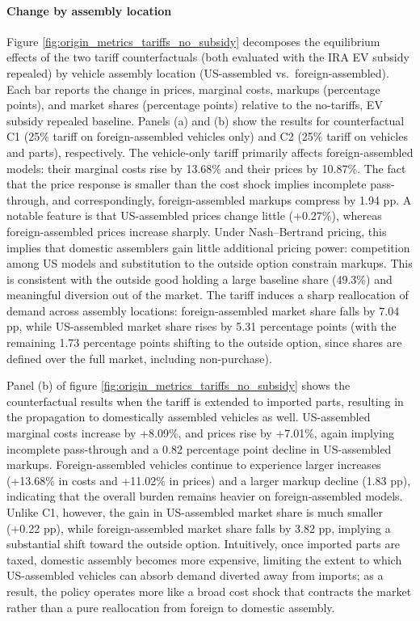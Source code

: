 \documentclass[11pt]{article}
\begin{document}
\paragraph{Change by assembly location}

Figure \ref{fig:origin_metrics_tariffs_no_subsidy} decomposes the equilibrium effects of the two tariff counterfactuals (both evaluated with the IRA EV subsidy repealed) by vehicle assembly location (US-assembled vs.\ foreign-assembled). Each bar reports the change in prices, marginal costs, markups (percentage points), and market shares (percentage points) relative to the no-tariffs, EV subsidy repealed baseline. Panels (a) and (b) show the results for counterfactual C1 (25\% tariff on foreign-assembled vehicles only) and C2 (25\% tariff on vehicles and parts), respectively. The vehicle-only tariff primarily affects foreign-assembled models: their marginal costs rise by 13.68\% and their prices by 10.87\%. The fact that the price response is smaller than the cost shock implies incomplete pass-through, and correspondingly, foreign-assembled markups compress by 1.94 pp. A notable feature is that US-assembled prices change little (+0.27\%), whereas foreign-assembled prices increase sharply. Under Nash–Bertrand pricing, this implies that domestic assemblers gain little additional pricing power: competition among US models and substitution to the outside option constrain markups. This is consistent with the outside good holding a large baseline share (49.3\%) and meaningful diversion out of the market. The tariff induces a sharp reallocation of demand across assembly locations: foreign-assembled market share falls by 7.04 pp, while US-assembled market share rises by 5.31 percentage points (with the remaining 1.73 percentage points shifting to the outside option, since shares are defined over the full market, including non-purchase).


Panel (b) of figure \ref{fig:origin_metrics_tariffs_no_subsidy} shows the counterfactual results when the tariff is extended to imported parts, resulting in the propagation to domestically assembled vehicles as well. US-assembled marginal costs increase by +8.09\%, and prices rise by +7.01\%, again implying incomplete pass-through and a 0.82 percentage point decline in US-assembled markups. Foreign-assembled vehicles continue to experience larger increases (+13.68\% in costs and +11.02\% in prices) and a larger markup decline (1.83 pp), indicating that the overall burden remains heavier on foreign-assembled models. Unlike C1, however, the gain in US-assembled market share is much smaller (+0.22 pp), while foreign-assembled market share falls by 3.82 pp, implying a substantial shift toward the outside option. Intuitively, once imported parts are taxed, domestic assembly becomes more expensive, limiting the extent to which US-assembled vehicles can absorb demand diverted away from imports; as a result, the policy operates more like a broad cost shock that contracts the market rather than a pure reallocation from foreign to domestic assembly.
\end{document}
